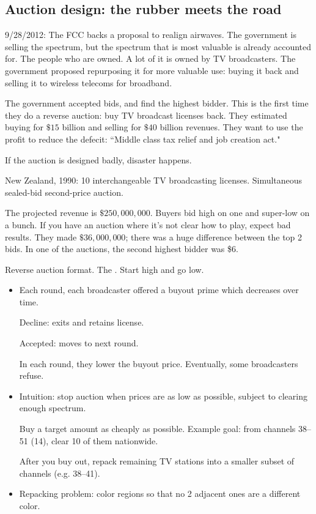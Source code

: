 \subsection{Auction design: the rubber meets the road}
9/28/2012: The FCC backs a proposal to realign airwaves. The government is selling the spectrum, but the spectrum that is most valuable is already accounted for. The people who are owned. A lot of it is owned by TV broadcasters. The government proposed repurposing it for more valuable use: buying it back and selling it to wireless telecoms for broadband.

The government accepted bids, and find the highest bidder. This is the first time they do a reverse auction: buy TV broadcast licenses back. They estimated buying for $\$15$ billion and selling for $\$40$ billion revenues. They want to use the profit to reduce the defecit: ``Middle class tax relief and job creation act."

If the auction is designed badly, disaster happens. 

\begin{ex}New Zealand, 1990: 10 interchangeable TV broadcasting licenses.
Simultaneous sealed-bid second-price auction. 

The projected revenue is $\$250,000,000$. Buyers bid high on one and super-low on a bunch. If you have an auction where it's not clear how to play, expect bad results.
They made $\$36,000,000$; there was a huge difference between the top 2 bids.
In one of the auctions, the second highest bidder was \$6.
\end{ex}

Reverse auction format. The . Start high and go low.
\begin{itemize}
\item
Each round, each broadcaster offered a buyout prime which decreases over time.

Decline: exits and retains license.

Accepted: moves to next round.

In each round, they lower the buyout price. Eventually, some broadcasters refuse.
\item Intuition: stop auction when prices are as low as possible, subject to clearing enough spectrum.

Buy a target amount as cheaply as possible. Example goal: from channels 38--51 (14), clear 10 of them nationwide.

After you buy out, repack remaining TV stations into a smaller subset of channels (e.g. 38--41).
\item Repacking problem: color regions so that no 2 adjacent ones are a different color.
\end{itemize}

